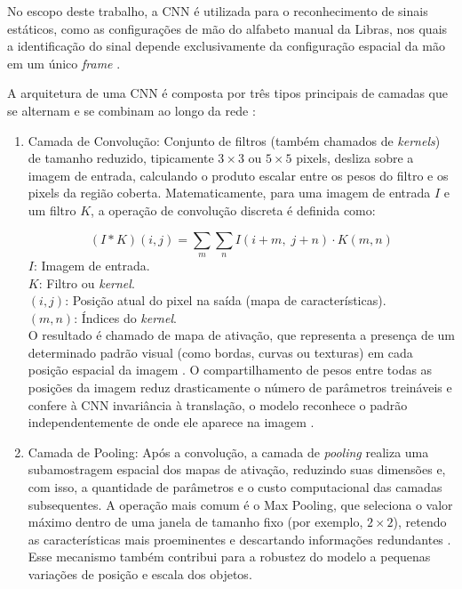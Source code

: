 \documentclass[
    12pt,                %
    openright,           %
    oneside,             %
    a4paper,             %
    english,             %
    brazil               %
]{abntex2}
\begin{document}
No escopo deste trabalho, a CNN é utilizada para o reconhecimento de sinais estáticos, como as configurações de mão do alfabeto manual da Libras, nos quais a identificação do sinal depende exclusivamente da configuração espacial da mão em um único \textit{frame} \cite{Fleck2016}.

A arquitetura de uma CNN é composta por três tipos principais de camadas que se alternam e se combinam ao longo da rede \cite{Goodfellow2016}:

\begin{enumerate}

  \item Camada de Convolução: Conjunto de filtros (também chamados de \textit{kernels}) de tamanho reduzido, tipicamente $3 \times 3$ ou $5 \times 5$ pixels, desliza sobre a imagem de entrada, calculando o produto escalar entre os pesos do filtro e os pixels da região coberta. Matematicamente, para uma imagem de entrada $I$ e um filtro $K$, a operação de convolução discreta é definida como:

  \begin{equation}
      (I * K)(i, j) = \sum_{m}\sum_{n} I(i+m,\; j+n) \cdot K(m, n)
  \end{equation}
  $I$: Imagem de entrada. \\
  $K$: Filtro ou \textit{kernel}. \\
  $(i, j)$: Posição atual do pixel na saída (mapa de características). \\
  $(m, n)$: Índices do \textit{kernel}. \\

  O resultado é chamado de mapa de ativação, que representa a presença de um determinado padrão visual (como bordas, curvas ou texturas) em cada posição espacial da imagem \cite{Goodfellow2016}. O compartilhamento de pesos entre todas as posições da imagem reduz drasticamente o número de parâmetros treináveis e confere à CNN invariância à translação, o modelo reconhece o padrão independentemente de onde ele aparece na imagem \cite{Fleck2016}.

  \item Camada de Pooling: Após a convolução, a camada de \textit{pooling} realiza uma subamostragem espacial dos mapas de ativação, reduzindo suas dimensões e, com isso, a quantidade de parâmetros e o custo computacional das camadas subsequentes. A operação mais comum é o Max Pooling, que seleciona o valor máximo dentro de uma janela de tamanho fixo (por exemplo, $2 \times 2$), retendo as características mais proeminentes e descartando informações redundantes \cite{Lecun1998}. Esse mecanismo também contribui para a robustez do modelo a pequenas variações de posição e escala dos objetos.


\end{enumerate}
\end{document}
